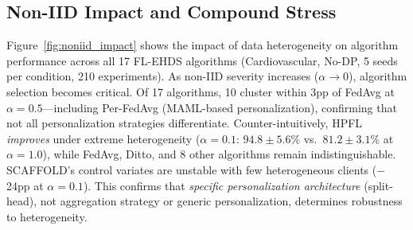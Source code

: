 \documentclass[conference,letterpaper]{IEEEtran}
\begin{document}
\subsection{Non-IID Impact and Compound Stress}

Figure~\ref{fig:noniid_impact} shows the impact of data heterogeneity on algorithm performance across all 17 FL-EHDS algorithms (Cardiovascular, No-DP, 5 seeds per condition, 210 experiments). As non-IID severity increases ($\alpha \to 0$), algorithm selection becomes critical. Of 17 algorithms, 10 cluster within 3pp of FedAvg at $\alpha{=}0.5$---including Per-FedAvg (MAML-based personalization), confirming that not all personalization strategies differentiate. Counter-intuitively, HPFL \textit{improves} under extreme heterogeneity ($\alpha{=}0.1$: $94.8 \pm 5.6$\% vs.\ $81.2 \pm 3.1$\% at $\alpha{=}1.0$), while FedAvg, Ditto, and 8 other algorithms remain indistinguishable. SCAFFOLD's control variates are unstable with few heterogeneous clients ($-$24pp at $\alpha{=}0.1$). This confirms that \textit{specific personalization architecture} (split-head), not aggregation strategy or generic personalization, determines robustness to heterogeneity.
\end{document}
